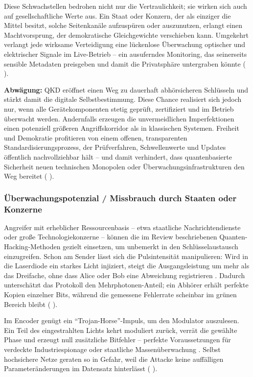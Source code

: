 {Diese Schwachstellen bedrohen nicht nur die Vertraulichkeit; sie wirken sich auch auf gesellschaftliche Werte aus. Ein Staat oder Konzern, der als einziger die Mittel besitzt, solche Seitenkanäle aufzuspüren oder auszunutzen, erlangt einen Machtvorsprung, der demokratische Gleichgewichte verschieben kann. Umgekehrt verlangt jede wirksame Verteidigung eine lückenlose Überwachung optischer und elektrischer Signale im Live-Betrieb – ein ausuferndes Monitoring, das seinerseits sensible Metadaten preisgeben und damit die Privatsphäre untergraben könnte (\cite{sunReviewSecurityEvaluation2022} ).

\textbf{Abwägung:}
QKD eröffnet einen Weg zu dauerhaft abhörsicheren Schlüsseln und stärkt damit die digitale Selbstbestimmung. Diese Chance realisiert sich jedoch nur, wenn alle Gerätekomponenten stetig geprüft, zertifiziert und im Betrieb überwacht werden. Andernfalls erzeugen die unvermeidlichen Imperfektionen einen potenziell größeren Angriffskorridor als in klassischen Systemen. Freiheit und Demokratie profitieren von einem offenen, transparenten Standardisierungsprozess, der Prüfverfahren, Schwellenwerte und Updates öffentlich nachvollziehbar hält – und damit verhindert, dass quantenbasierte Sicherheit neuen technischen Monopolen oder Überwachungsinfrastrukturen den Weg bereitet (\cite{sunReviewSecurityEvaluation2022} ).

\subsubsection{Überwachungspotenzial / Missbrauch durch Staaten oder Konzerne}
Angreifer mit erheblicher Ressourcenbasis – etwa staatliche Nachrichtendienste oder große Technologiekonzerne – können die im Review beschriebenen Quanten-Hacking-Methoden gezielt einsetzen, um unbemerkt in den Schlüsselaustausch einzugreifen. Schon am Sender lässt sich die Pulsintensität manipulieren: Wird in die Laserdiode ein starkes Licht injiziert, steigt die Ausgangsleistung um mehr als das Dreifache, ohne dass Alice oder Bob eine Abweichung registrieren . Dadurch unterschätzt das Protokoll den Mehrphotonen-Anteil; ein Abhörer erhält perfekte Kopien einzelner Bits, während die gemessene Fehlerrate scheinbar im grünen Bereich bleibt (\cite{sunReviewSecurityEvaluation2022} ).

Im Encoder genügt ein “Trojan-Horse”-Impuls, um den Modulator auszulesen. Ein Teil des eingestrahlten Lichts kehrt moduliert zurück, verrät die gewählte Phase und erzeugt null zusätzliche Bitfehler – perfekte Voraussetzungen für verdeckte Industriespionage oder staatliche Massenüberwachung . Selbst hochsichere Netze geraten so in Gefahr, weil die Attacke keine auffälligen Parameteränderungen im Datensatz hinterlässt (\cite{sunReviewSecurityEvaluation2022} ).

}
